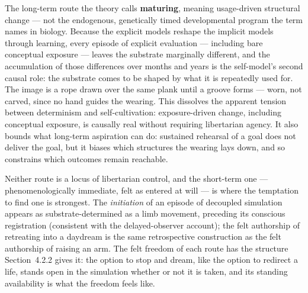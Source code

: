 \documentclass[12pt]{article}
\begin{document}
{The long-term route the theory calls \textbf{maturing}, meaning usage-driven structural change --- not the endogenous, genetically timed developmental program the term names in biology. Because the explicit models reshape the implicit models through learning, every episode of explicit evaluation --- including bare conceptual exposure --- leaves the substrate marginally different, and the accumulation of those differences over months and years is the self-model's second causal role: the substrate comes to be shaped by what it is repeatedly used for. The image is a rope drawn over the same plank until a groove forms --- worn, not carved, since no hand guides the wearing. This dissolves the apparent tension between determinism and self-cultivation: exposure-driven change, including conceptual exposure, is causally real without requiring libertarian agency. It also bounds what long-term aspiration can do: sustained rehearsal of a goal does not deliver the goal, but it biases which structures the wearing lays down, and so constrains which outcomes remain reachable.

Neither route is a locus of libertarian control, and the short-term one --- phenomenologically immediate, felt as entered at will --- is where the temptation to find one is strongest. The \emph{initiation} of an episode of decoupled simulation appears as substrate-determined as a limb movement, preceding its conscious registration (consistent with the delayed-observer account); the felt authorship of retreating into a daydream is the same retrospective construction as the felt authorship of raising an arm. The felt freedom of each route has the structure Section~4.2.2 gives it: the option to stop and dream, like the option to redirect a life, stands open in the simulation whether or not it is taken, and its standing availability is what the freedom feels like.

}
\end{document}
